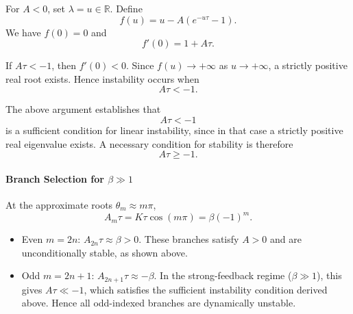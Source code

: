 \documentclass[11pt]{article}
\begin{document}
            For $A<0$, set $\lambda=u\in\mathbb{R}$.
            Define
            \[
                f(u)=u-A(e^{-u\tau}-1).
            \]
            We have $f(0)=0$ and
            \[
                f'(0)=1+A\tau.
            \]

            If $A\tau<-1$, then $f'(0)<0$.
            Since $f(u)\to+\infty$ as $u\to+\infty$, a strictly positive real root exists.
            Hence instability occurs when
            \begin{equation}
                A\tau<-1.
                \label{eq:stability_window}
            \end{equation}

            The above argument establishes that
            \begin{equation}
                A\tau<-1
            \end{equation}
            is a sufficient condition for linear instability, since in that case a strictly positive real eigenvalue exists.
            A necessary condition for stability is therefore
            \begin{equation}
                A\tau\ge -1.
            \end{equation}

        \paragraph{Branch Selection for \texorpdfstring{$\beta\gg1$}{beta>>1}}

            At the approximate roots $\theta_m\approx m\pi$,
            \begin{equation}
                A_m\tau = K\tau\cos(m\pi) = \beta(-1)^m.
            \end{equation}

            \begin{itemize}
                \item Even $m=2n$: $A_{2n}\tau\approx\beta>0$.
                These branches satisfy $A>0$ and are unconditionally stable, as shown above.

                \item Odd $m=2n+1$: $A_{2n+1}\tau\approx-\beta$.
                In the strong-feedback regime ($\beta\gg1$), this gives $A\tau\ll-1$, which satisfies the sufficient instability condition derived above.
                Hence all odd-indexed branches are dynamically unstable.
            \end{itemize}
\end{document}
